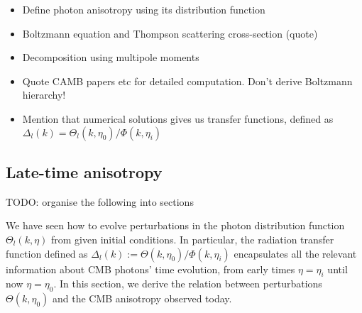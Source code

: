 \begin{itemize}
	\item Define photon anisotropy using its distribution function
	\item Boltzmann equation and Thompson scattering cross-section (quote)
	\item Decomposition using multipole moments
	\item Quote CAMB papers etc for detailed computation. Don't derive Boltzmann hierarchy!
	\item Mention that numerical solutions gives us transfer functions, defined as $\Delta_l (k) = \Theta_l(k,\eta_0) / \Phi(k,\eta_i)$
\end{itemize}


\subsection{Late-time anisotropy}

TODO: organise the following into sections

We have seen how to evolve perturbations in the photon distribution function $\Theta_l(k,\eta)$ from given initial conditions. In particular, the radiation transfer function defined as $\Delta_l(k) := \Theta(k,\eta_0) / \Phi(k,\eta_i) $ encapsulates all the relevant information about CMB photons' time evolution, from early times $\eta=\eta_i$ until now $\eta=\eta_0$. In this section, we derive the relation between perturbations $\Theta(k,\eta_0)$ and the CMB anisotropy observed today.

